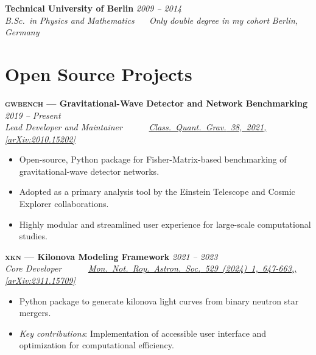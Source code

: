 \documentclass[10pt, a4paper]{article}
\makeatletter
\newcommand{\cventry}[4]{%
  \textbf{#1}                      \hfill {\color{muted}\small\textit{#4}} \\[2pt]
  {\color{muted}\small\textit{#2}} \hfill {\color{muted}\small\textit{#3}}
}
\newcommand{\tpc}{\textperiodcentered}
\makeatother
\begin{document}

\vspace{6pt}
\cventry%
  {Technical University of Berlin}%
  {B.Sc.\ in Physics and Mathematics ~\tpc~ Only double degree in my cohort}%
  {Berlin, Germany}%
  {2009 -- 2014}
  

\section{Open Source Projects}

\cventry%
  {\textsc{gwbench} --- Gravitational-Wave Detector and Network Benchmarking}%
  {Lead Developer and Maintainer ~\tpc~ 
   \href{https://gitlab.com/sborhanian/gwbench}{\faGitlab}  ~\tpc~ 
   \href{https://arxiv.org/abs/2010.15202}{\textit{Class.~Quant.~Grav.}~38,~2021, [arXiv:2010.15202]} }%
  {}%
  {2019 -- Present}
\begin{itemize}
  \item Open-source, Python package for Fisher-Matrix-based benchmarking of gravitational-wave detector networks.
  \item Adopted as a primary analysis tool by the Einstein Telescope and Cosmic Explorer collaborations.
  \item Highly modular and streamlined user experience for large-scale computational studies.
\end{itemize}

\vspace{3pt}
\cventry%
  {\textsc{xkn} --- Kilonova Modeling Framework}%
  {Core Developer ~\tpc~ \href{https://github.com/GiacomoRicigliano/xkn}{\faGithub}
   ~\tpc~
   \href{https://arxiv.org/abs/2311.15709}{\textit{Mon.~Not.~Roy.~Astron.~Soc.}~529~(2024)~1,~647-663,, [arXiv:2311.15709]} }%
  {}%
  {2021 -- 2023}
\begin{itemize}
  \item Python package to generate kilonova light curves from binary neutron star mergers.
  \item {\em \color{muted} Key contributions}: Implementation of accessible user interface and optimization for computational efficiency.
\end{itemize}
\end{document}
